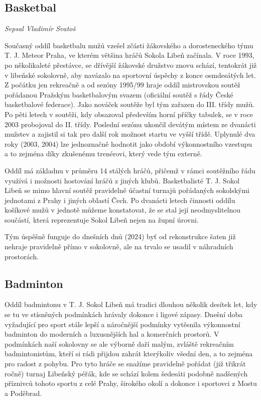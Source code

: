 \subsection{Basketbal}\label{basketbal}

\emph{Sepsal Vladimír Svatoš}

Současný oddíl basketbalu mužů vzešel zčásti žákovského a dorosteneckého
týmu T. J. Meteor Praha, ve kterém většina hráčů Sokola Libeň začínala.
V roce 1993, po několikaleté přestávce, se dřívější žákovské družstvo
znovu schází, tentokrát již v libeňské sokolovně, aby navázalo na
sportovní úspěchy z konce osmdesátých let. Z počátku jen rekreačně a od
sezóny 1995/99 hraje oddíl mistrovskou soutěž pořádanou Pražským
basketbalovým svazem (oficiální soutěž s řády České basketbalové
federace). Jako nováček soutěže byl tým zařazen do III. třídy mužů. Po
pěti letech v soutěži, kdy obsazoval především horní příčky tabulek, se
v roce 2003 probojoval do II. třídy. Poslední sezónu ukončil devátým
místem ze dvanácti mužstev a zajistil si tak pro další rok možnost
startu ve vyšší třídě. Uplynulé dva roky (2003, 2004) lze jednoznačně
hodnotit jako období výkonnostního vzestupu a to zejména díky zkušenému
trenérovi, který vede tým externě.

Oddíl má základnu v průměru 14 stálých hráčů, přičemž v rámci soutěžního
řádu využívá i možnosti hostování hráčů z jiných klubů. Basketbalisté T.
J. Sokol Libeň se mimo hlavní soutěž pravidelně účastní turnajů
pořádaných sokolskými jednotami z Prahy i jiných oblastí Čech. Po
dvanácti letech činnosti oddílu košíkové mužů v jednotě můžeme
konstatovat, že se stal její neodmyslitelnou součástí, která
reprezentuje Sokol Libeň nejen na župní úrovni.

Tým úspěšně funguje do dnešních dnů (2024) byť od rekonstrukce šaten již
nehraje pravidelně přímo v sokolovně, ale na trvalo se usadil v
náhradních prostorách.

\subsection{Badminton}\label{badminton}

Oddíl badmintonu v T. J. Sokol Libeň má tradici dlouhou několik desítek
let, kdy se tu ve stísněných podmínkách hrávaly dokonce i ligové zápasy.
Dnešní doba vyžadující pro sport stále lepší a náročnější podmínky
vytěsnila výkonnostní badminton do moderních a luxusnějších hal a
komerčních prostorů. V podmínkách naší sokolovny se ale výborně daří
malým, zvláště rekreačním badmintonistům, kteří si rádi přijdou zahrát
kterýkoliv všední den, a to zejména pro radost z pohybu. Pro tyto hráče
se snažíme pravidelně pořádat (již třikrát ročně) turnaj Libeňský péřák,
kde se schází kolem šedesáti podobně nadšených příznivců tohoto sportu z
celé Prahy, širokého okolí a dokonce i sportovci z Mostu a Poděbrad.

